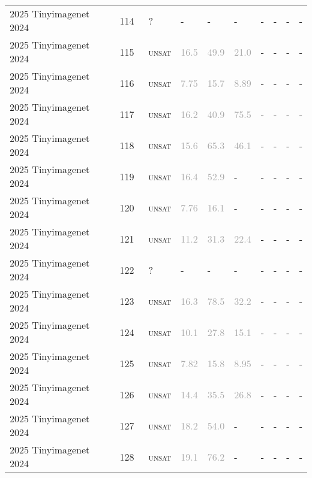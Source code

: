 \begin{center}
{\begin{longtable}{@{}llllllllll@{}}
2025 Tinyimagenet 2024 & 114 & ~? & - & - & - & - & - & - & - \\
2025 Tinyimagenet 2024 & 115 & ~\textsc{unsat} & \textcolor{darkgray}{16.5} & \textcolor{darkgray}{49.9} & \textcolor{darkgray}{21.0} & - & - & - & - \\
2025 Tinyimagenet 2024 & 116 & ~\textsc{unsat} & \textcolor{darkgray}{7.75} & \textcolor{darkgray}{15.7} & \textcolor{darkgray}{8.89} & - & - & - & - \\
2025 Tinyimagenet 2024 & 117 & ~\textsc{unsat} & \textcolor{darkgray}{16.2} & \textcolor{darkgray}{40.9} & \textcolor{darkgray}{75.5} & - & - & - & - \\
2025 Tinyimagenet 2024 & 118 & ~\textsc{unsat} & \textcolor{darkgray}{15.6} & \textcolor{darkgray}{65.3} & \textcolor{darkgray}{46.1} & - & - & - & - \\
2025 Tinyimagenet 2024 & 119 & ~\textsc{unsat} & \textcolor{darkgray}{16.4} & \textcolor{darkgray}{52.9} & - & - & - & - & - \\
2025 Tinyimagenet 2024 & 120 & ~\textsc{unsat} & \textcolor{darkgray}{7.76} & \textcolor{darkgray}{16.1} & - & - & - & - & - \\
2025 Tinyimagenet 2024 & 121 & ~\textsc{unsat} & \textcolor{darkgray}{11.2} & \textcolor{darkgray}{31.3} & \textcolor{darkgray}{22.4} & - & - & - & - \\
2025 Tinyimagenet 2024 & 122 & ~? & - & - & - & - & - & - & - \\
2025 Tinyimagenet 2024 & 123 & ~\textsc{unsat} & \textcolor{darkgray}{16.3} & \textcolor{darkgray}{78.5} & \textcolor{darkgray}{32.2} & - & - & - & - \\
2025 Tinyimagenet 2024 & 124 & ~\textsc{unsat} & \textcolor{darkgray}{10.1} & \textcolor{darkgray}{27.8} & \textcolor{darkgray}{15.1} & - & - & - & - \\
2025 Tinyimagenet 2024 & 125 & ~\textsc{unsat} & \textcolor{darkgray}{7.82} & \textcolor{darkgray}{15.8} & \textcolor{darkgray}{8.95} & - & - & - & - \\
2025 Tinyimagenet 2024 & 126 & ~\textsc{unsat} & \textcolor{darkgray}{14.4} & \textcolor{darkgray}{35.5} & \textcolor{darkgray}{26.8} & - & - & - & - \\
2025 Tinyimagenet 2024 & 127 & ~\textsc{unsat} & \textcolor{darkgray}{18.2} & \textcolor{darkgray}{54.0} & - & - & - & - & - \\
2025 Tinyimagenet 2024 & 128 & ~\textsc{unsat} & \textcolor{darkgray}{19.1} & \textcolor{darkgray}{76.2} & - & - & - & - & - \\

\end{longtable}}
\end{center}
